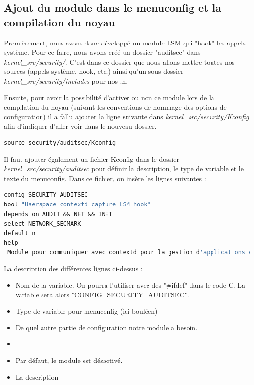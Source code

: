 \documentclass[pdftex,a4paper,titlepage,11pt]{article}
\begin{document}
\subsection{Ajout du module dans le menuconfig et la compilation du noyau}

Premièrement, nous avons donc développé un module LSM qui "hook" les appels système. Pour ce faire, nous avons créé un dossier "auditsec" dans \textit{{kernel\_src}/security/}. C'est dans ce dossier que nous allons mettre toutes nos sources (appels système, hook, etc.) ainsi qu'un sous dossier \textit{{kernel\_src}/security/includes} pour nos .h.  

Ensuite,  pour avoir la possibilité d'activer ou non ce module lors de la compilation du noyau (suivant les conventions de nommage des options de configuration) il a fallu ajouter la ligne suivante dans \textit{{kernel\_src}/security/Kconfig} afin d'indiquer d'aller voir dans le nouveau dossier.


\begin{lstlisting}[language=make]
source security/auditsec/Kconfig
\end{lstlisting}

Il faut ajouter également un fichier Kconfig dans le dossier \textit{{kernel\_src}/security/auditsec} pour définir la description, le type de variable et le texte du menuconfig. Dans ce fichier, on insère les lignes suivantes :

\begin{lstlisting}[language=make]
config SECURITY_AUDITSEC
bool "Userspace contextd capture LSM hook"
depends on AUDIT && NET && INET
select NETWORK_SECMARK
default n
help
 Module pour communiquer avec contextd pour la gestion d'applications en userspace.
\end{lstlisting}

La description des différentes lignes ci-dessus :
\begin{itemize}
	\item Nom de la variable. On pourra l'utiliser avec des "\#ifdef" dans le code C. La variable sera alors "CONFIG\_SECURITY\_AUDITSEC".
	\item Type de variable pour menuconfig (ici bouléen)
	\item De quel autre partie de configuration notre module a besoin.
	\item
	\item Par défaut, le module est désactivé.
	\item La description
\end{itemize}
\end{document}
